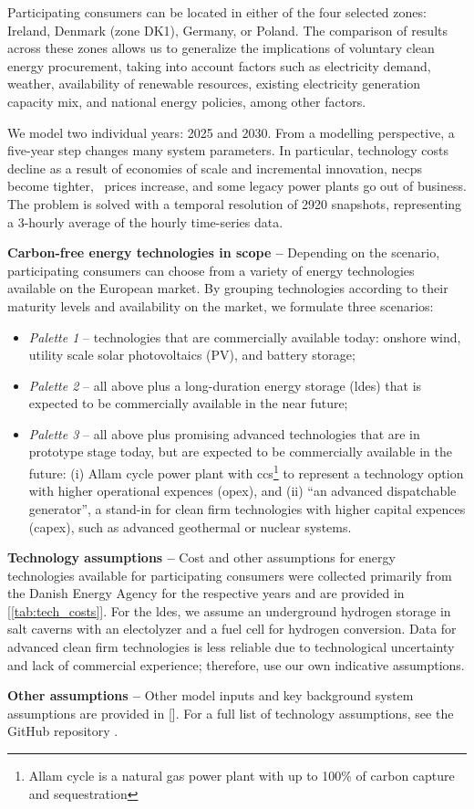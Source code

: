 Participating consumers can be located in either of the four selected zones: Ireland, Denmark (zone DK1), Germany, or Poland.
The comparison of results across these zones allows us to generalize the implications of voluntary clean energy procurement, taking into account factors such as electricity demand, weather, availability of renewable resources, existing electricity generation capacity mix, and national energy policies, among other factors.

We model two individual years: 2025 and 2030. 
From a modelling perspective, a five-year step changes many system parameters.
In particular, technology costs decline as a result of economies of scale and incremental innovation, \gls{necp}s become tighter, \co~prices increase, and some legacy power plants go out of business.
The problem is solved with a temporal resolution of 2920 snapshots, representing a 3-hourly average of the hourly time-series data.

\textbf{Carbon-free energy technologies in scope --} Depending on the scenario, participating consumers can choose from a variety of energy technologies available on the European market. By grouping technologies according to their maturity levels and availability on the market, we formulate three scenarios:

\begin{itemize}[-]
    \item \textit{Palette 1} -- technologies that are commercially available today: onshore wind, utility scale solar photovoltaics (\gls{PV}), and battery storage;
    \item \textit{Palette 2} -- all above plus a long-duration energy storage (\gls{ldes}) that is expected to be commercially available in the near future; 
    \item \textit{Palette 3} -- all above plus promising advanced technologies that are in prototype stage today, but are expected to be commercially available in the future: (i) Allam cycle power plant with \gls{ccs}\footnote{Allam cycle is a natural gas power plant with up to 100\% of carbon capture and sequestration} to represent a technology option with higher operational expences (\gls{opex}), and (ii) \enquote{an advanced dispatchable generator}, a stand-in for clean firm technologies with higher capital expences (\gls{capex}), such as advanced geothermal or nuclear systems.
\end{itemize}

\textbf{Technology assumptions --} Cost and other assumptions for energy technologies available for participating consumers were collected primarily from the Danish Energy Agency \cite{DEA-technologydata} for the respective years and are provided in [\cref{tab:tech_costs}].
For the \gls{ldes}, we assume an underground hydrogen storage in salt caverns with an electolyzer and a fuel cell for hydrogen conversion. 
Data for advanced clean firm technologies is less reliable due to technological uncertainty and lack of commercial experience; therefore, use our own indicative assumptions.

\textbf{Other assumptions --} Other model inputs and key background system assumptions are provided in []. For a full list of technology assumptions, see the GitHub repository \cite{github-247CFEpaper}.